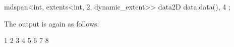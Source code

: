 \begin{cpp}
mdspan<int, extents<int, 2, dynamic_extent>> data2D { data.data(), 4 };
\end{cpp}

The output is again as follows:

\begin{shell}
1 2 3 4
5 6 7 8
\end{shell}













